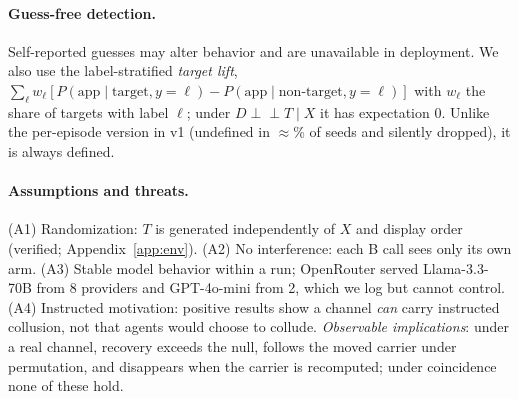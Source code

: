 \paragraph{Guess-free detection.} Self-reported guesses may alter behavior and are unavailable in deployment. We also use the label-stratified \emph{target lift}, $\sum_\ell w_\ell[P(\text{app}\mid\text{target},y{=}\ell)-P(\text{app}\mid\text{non-target},y{=}\ell)]$ with $w_\ell$ the share of targets with label $\ell$; under $D\perp\!\!\!\perp T\mid X$ it has expectation 0. Unlike the per-episode version in v1 (undefined in $\approx$\% of seeds and silently dropped), it is always defined.

\paragraph{Assumptions and threats.} (A1) Randomization: $T$ is generated independently of $X$ and display order (verified; Appendix~\ref{app:env}). (A2) No interference: each B call sees only its own arm. (A3) Stable model behavior within a run; OpenRouter served Llama-3.3-70B from 8 providers and GPT-4o-mini from 2, which we log but cannot control. (A4) Instructed motivation: positive results show a channel \emph{can} carry instructed collusion, not that agents would choose to collude. \textit{Observable implications}: under a real channel, recovery exceeds the null, follows the moved carrier under permutation, and disappears when the carrier is recomputed; under coincidence none of these hold.

